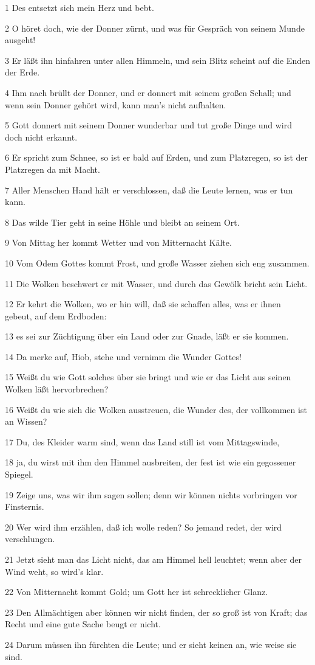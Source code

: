 \par 1 Des entsetzt sich mein Herz und bebt.
\par 2 O höret doch, wie der Donner zürnt, und was für Gespräch von seinem Munde ausgeht!
\par 3 Er läßt ihn hinfahren unter allen Himmeln, und sein Blitz scheint auf die Enden der Erde.
\par 4 Ihm nach brüllt der Donner, und er donnert mit seinem großen Schall; und wenn sein Donner gehört wird, kann man's nicht aufhalten.
\par 5 Gott donnert mit seinem Donner wunderbar und tut große Dinge und wird doch nicht erkannt.
\par 6 Er spricht zum Schnee, so ist er bald auf Erden, und zum Platzregen, so ist der Platzregen da mit Macht.
\par 7 Aller Menschen Hand hält er verschlossen, daß die Leute lernen, was er tun kann.
\par 8 Das wilde Tier geht in seine Höhle und bleibt an seinem Ort.
\par 9 Von Mittag her kommt Wetter und von Mitternacht Kälte.
\par 10 Vom Odem Gottes kommt Frost, und große Wasser ziehen sich eng zusammen.
\par 11 Die Wolken beschwert er mit Wasser, und durch das Gewölk bricht sein Licht.
\par 12 Er kehrt die Wolken, wo er hin will, daß sie schaffen alles, was er ihnen gebeut, auf dem Erdboden:
\par 13 es sei zur Züchtigung über ein Land oder zur Gnade, läßt er sie kommen.
\par 14 Da merke auf, Hiob, stehe und vernimm die Wunder Gottes!
\par 15 Weißt du wie Gott solches über sie bringt und wie er das Licht aus seinen Wolken läßt hervorbrechen?
\par 16 Weißt du wie sich die Wolken ausstreuen, die Wunder des, der vollkommen ist an Wissen?
\par 17 Du, des Kleider warm sind, wenn das Land still ist vom Mittagswinde,
\par 18 ja, du wirst mit ihm den Himmel ausbreiten, der fest ist wie ein gegossener Spiegel.
\par 19 Zeige uns, was wir ihm sagen sollen; denn wir können nichts vorbringen vor Finsternis.
\par 20 Wer wird ihm erzählen, daß ich wolle reden? So jemand redet, der wird verschlungen.
\par 21 Jetzt sieht man das Licht nicht, das am Himmel hell leuchtet; wenn aber der Wind weht, so wird's klar.
\par 22 Von Mitternacht kommt Gold; um Gott her ist schrecklicher Glanz.
\par 23 Den Allmächtigen aber können wir nicht finden, der so groß ist von Kraft; das Recht und eine gute Sache beugt er nicht.
\par 24 Darum müssen ihn fürchten die Leute; und er sieht keinen an, wie weise sie sind.

